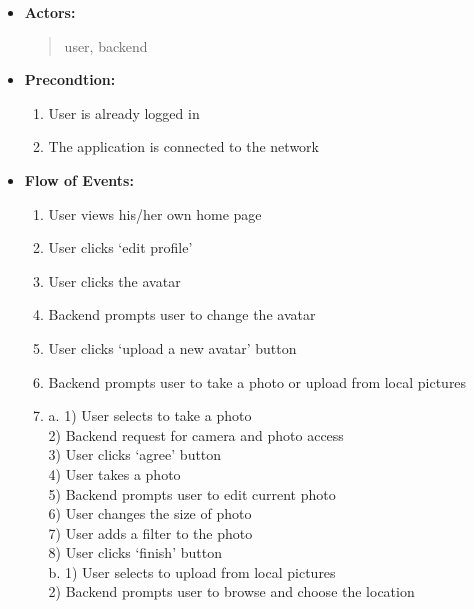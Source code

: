 \documentclass[a4paper]{article}
\begin{document}
	\begin{itemize}
		\item[] \textbf{Actors:}
		\begin{quote}
			user, backend
		\end{quote}
		\item[] \textbf{Precondtion:}
		\begin{enumerate}[itemindent=1em]
			\item User is already logged in
			\item The application is connected to the network			
		\end{enumerate}
		\item[] \textbf{Flow of Events:}
		\begin{enumerate}[itemindent=1em]
			\item User views his/her own home page
			\item User clicks `edit profile'
			\item User clicks the avatar
			\item Backend prompts user to change the avatar
			\item User clicks `upload a new avatar' button
			\item Backend prompts user to take a photo or upload from local pictures
			\item 
			a. 1) User selects to take a photo\\
			\hspace*{0.7cm} 2) Backend request for camera and photo access\\
			\hspace*{0.7cm} 3) User clicks `agree' button\\
			\hspace*{0.7cm} 4) User takes a photo\\
			\hspace*{0.7cm} 5) Backend prompts user to edit current photo\\
			\hspace*{0.7cm} 6) User changes the size of photo\\
			\hspace*{0.7cm} 7) User adds a filter to the photo\\
			\hspace*{0.7cm} 8) User clicks `finish' button\\
			\hspace*{0.25cm} b. 1)  User selects to upload from local pictures\\
    		\hspace*{0.7cm} 2)  Backend prompts user to browse and choose the location\\

\end{enumerate}
\end{itemize}
\end{document}
